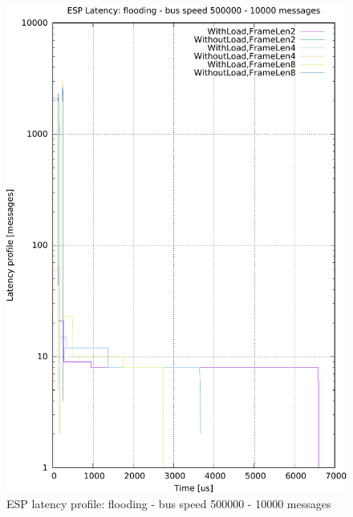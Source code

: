 \documentclass{ctuthesis}
\begin{document}
\begin{figure}[htb]
\includegraphics[width=\linewidth]{figures/speed500000_messages10000_floodTrue.pdf}
\caption{ESP latency profile: flooding - bus speed 500000 - 10000 messages}
\end{figure}
\end{document}
